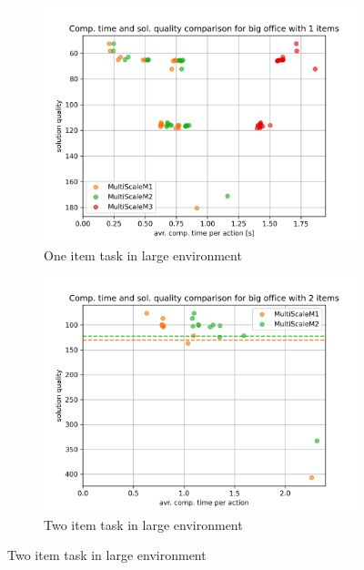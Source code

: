 \begin{figure}
        \hfill
    \begin{subfigure}[b]{0.49\textwidth}
        \includegraphics[width=\textwidth]{Report/images/comp_time_vs_sol_quality/envbig_sc01_noavr_scatter_comptimes_vs_solqual.png}
        \caption{One item task in large environment}
        \label{subfig:comp_sc01Big}
    \end{subfigure}
    \hfill
    \begin{subfigure}[b]{0.49\textwidth}
         \includegraphics[width=\textwidth]{Report/images/comp_time_vs_sol_quality/envbig_sc03_scatter_comptimes_vs_solqual.png}
        \caption{Two item task in large environment}
        \label{subfig:comp_sc03Big}
    \end{subfigure}
    

\end{figure}
